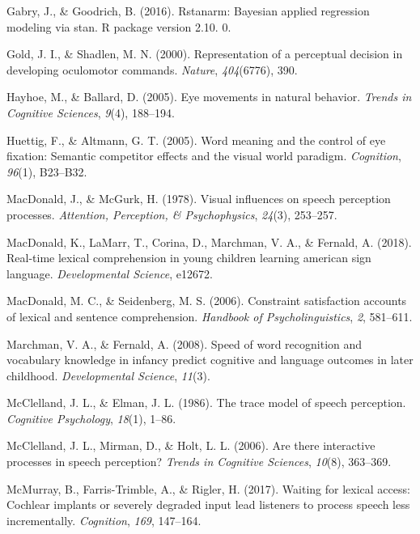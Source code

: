 \documentclass[english,floatsintext,man]{apa6}
\theoremstyle{definition}
\theoremstyle{definition}
\theoremstyle{definition}
\theoremstyle{remark}
\begin{document}
\leavevmode\hypertarget{ref-gabry2016rstanarm}{}%
Gabry, J., \& Goodrich, B. (2016). Rstanarm: Bayesian applied regression
modeling via stan. R package version 2.10. 0.

\leavevmode\hypertarget{ref-gold2000representation}{}%
Gold, J. I., \& Shadlen, M. N. (2000). Representation of a perceptual
decision in developing oculomotor commands. \emph{Nature},
\emph{404}(6776), 390.

\leavevmode\hypertarget{ref-hayhoe2005eye}{}%
Hayhoe, M., \& Ballard, D. (2005). Eye movements in natural behavior.
\emph{Trends in Cognitive Sciences}, \emph{9}(4), 188--194.

\leavevmode\hypertarget{ref-huettig2005word}{}%
Huettig, F., \& Altmann, G. T. (2005). Word meaning and the control of
eye fixation: Semantic competitor effects and the visual world paradigm.
\emph{Cognition}, \emph{96}(1), B23--B32.

\leavevmode\hypertarget{ref-macdonald1978visual}{}%
MacDonald, J., \& McGurk, H. (1978). Visual influences on speech
perception processes. \emph{Attention, Perception, \& Psychophysics},
\emph{24}(3), 253--257.

\leavevmode\hypertarget{ref-macdonald2018real}{}%
MacDonald, K., LaMarr, T., Corina, D., Marchman, V. A., \& Fernald, A.
(2018). Real-time lexical comprehension in young children learning
american sign language. \emph{Developmental Science}, e12672.

\leavevmode\hypertarget{ref-macdonald2006constraint}{}%
MacDonald, M. C., \& Seidenberg, M. S. (2006). Constraint satisfaction
accounts of lexical and sentence comprehension. \emph{Handbook of
Psycholinguistics}, \emph{2}, 581--611.

\leavevmode\hypertarget{ref-marchman2008speed}{}%
Marchman, V. A., \& Fernald, A. (2008). Speed of word recognition and
vocabulary knowledge in infancy predict cognitive and language outcomes
in later childhood. \emph{Developmental Science}, \emph{11}(3).

\leavevmode\hypertarget{ref-mcclelland1986trace}{}%
McClelland, J. L., \& Elman, J. L. (1986). The trace model of speech
perception. \emph{Cognitive Psychology}, \emph{18}(1), 1--86.

\leavevmode\hypertarget{ref-mcclelland2006there}{}%
McClelland, J. L., Mirman, D., \& Holt, L. L. (2006). Are there
interactive processes in speech perception? \emph{Trends in Cognitive
Sciences}, \emph{10}(8), 363--369.

\leavevmode\hypertarget{ref-mcmurray2017waiting}{}%
McMurray, B., Farris-Trimble, A., \& Rigler, H. (2017). Waiting for
lexical access: Cochlear implants or severely degraded input lead
listeners to process speech less incrementally. \emph{Cognition},
\emph{169}, 147--164.
\end{document}
